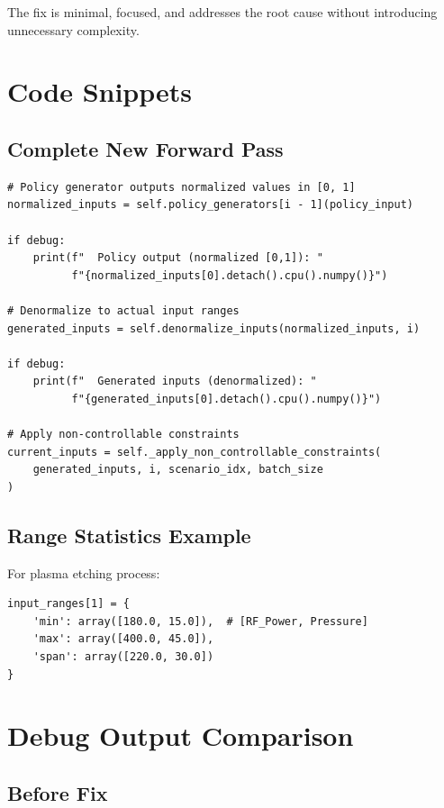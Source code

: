 \documentclass[11pt,a4paper]{article}
\begin{document}
The fix is minimal, focused, and addresses the root cause without introducing unnecessary complexity.

\appendix

\section{Code Snippets}

\subsection{Complete New Forward Pass}

\begin{lstlisting}[caption={ProcessChain forward with denormalization}]
# Policy generator outputs normalized values in [0, 1]
normalized_inputs = self.policy_generators[i - 1](policy_input)

if debug:
    print(f"  Policy output (normalized [0,1]): "
          f"{normalized_inputs[0].detach().cpu().numpy()}")

# Denormalize to actual input ranges
generated_inputs = self.denormalize_inputs(normalized_inputs, i)

if debug:
    print(f"  Generated inputs (denormalized): "
          f"{generated_inputs[0].detach().cpu().numpy()}")

# Apply non-controllable constraints
current_inputs = self._apply_non_controllable_constraints(
    generated_inputs, i, scenario_idx, batch_size
)
\end{lstlisting}

\subsection{Range Statistics Example}

For plasma etching process:
\begin{verbatim}
input_ranges[1] = {
    'min': array([180.0, 15.0]),  # [RF_Power, Pressure]
    'max': array([400.0, 45.0]),
    'span': array([220.0, 30.0])
}
\end{verbatim}

\section{Debug Output Comparison}

\subsection{Before Fix}
\end{document}
